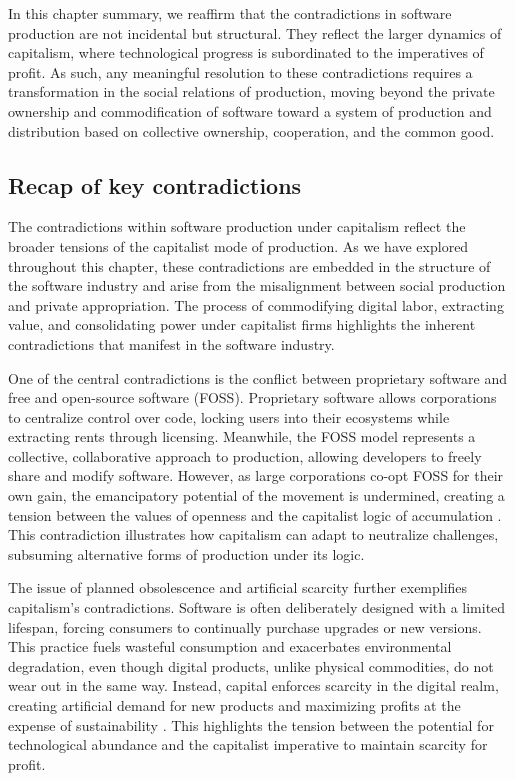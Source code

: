 In this chapter summary, we reaffirm that the contradictions in software production are not incidental but structural. They reflect the larger dynamics of capitalism, where technological progress is subordinated to the imperatives of profit. As such, any meaningful resolution to these contradictions requires a transformation in the social relations of production, moving beyond the private ownership and commodification of software toward a system of production and distribution based on collective ownership, cooperation, and the common good.

\subsection{Recap of key contradictions}

The contradictions within software production under capitalism reflect the broader tensions of the capitalist mode of production. As we have explored throughout this chapter, these contradictions are embedded in the structure of the software industry and arise from the misalignment between social production and private appropriation. The process of commodifying digital labor, extracting value, and consolidating power under capitalist firms highlights the inherent contradictions that manifest in the software industry.

One of the central contradictions is the conflict between proprietary software and free and open-source software (FOSS). Proprietary software allows corporations to centralize control over code, locking users into their ecosystems while extracting rents through licensing. Meanwhile, the FOSS model represents a collective, collaborative approach to production, allowing developers to freely share and modify software. However, as large corporations co-opt FOSS for their own gain, the emancipatory potential of the movement is undermined, creating a tension between the values of openness and the capitalist logic of accumulation \cite[pp.~88-90]{raymond2022}. This contradiction illustrates how capitalism can adapt to neutralize challenges, subsuming alternative forms of production under its logic.

The issue of planned obsolescence and artificial scarcity further exemplifies capitalism’s contradictions. Software is often deliberately designed with a limited lifespan, forcing consumers to continually purchase upgrades or new versions. This practice fuels wasteful consumption and exacerbates environmental degradation, even though digital products, unlike physical commodities, do not wear out in the same way. Instead, capital enforces scarcity in the digital realm, creating artificial demand for new products and maximizing profits at the expense of sustainability \cite[pp.~151-154]{foster2019}. This highlights the tension between the potential for technological abundance and the capitalist imperative to maintain scarcity for profit.

